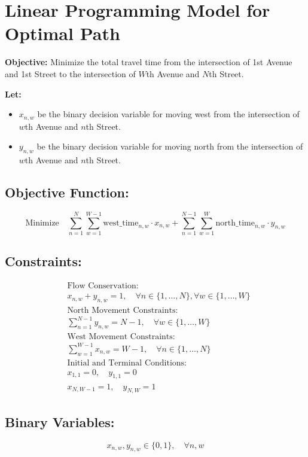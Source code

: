 \documentclass{article}
\begin{document}
\section*{Linear Programming Model for Optimal Path}

\textbf{Objective:} Minimize the total travel time from the intersection of 1st Avenue and 1st Street to the intersection of \(W\)th Avenue and \(N\)th Street.

\textbf{Let:}
\begin{itemize}
    \item \(x_{n,w}\) be the binary decision variable for moving west from the intersection of \(w\)th Avenue and \(n\)th Street.
    \item \(y_{n,w}\) be the binary decision variable for moving north from the intersection of \(w\)th Avenue and \(n\)th Street.
\end{itemize}

\subsection*{Objective Function:}

\[
\text{Minimize} \quad \sum_{n=1}^{N} \sum_{w=1}^{W-1} \text{west\_time}_{n,w} \cdot x_{n,w} + \sum_{n=1}^{N-1} \sum_{w=1}^{W} \text{north\_time}_{n,w} \cdot y_{n,w}
\]

\subsection*{Constraints:}

\begin{align*}
&\text{Flow Conservation:} \\
&x_{n,w} + y_{n,w} = 1, \quad \forall n \in \{1, \ldots, N\}, \forall w \in \{1, \ldots, W\}\\
&\text{North Movement Constraints:} \\
&\sum_{n=1}^{N-1} y_{n,w} = N-1, \quad \forall w \in \{1, \ldots, W\}\\
&\text{West Movement Constraints:} \\
&\sum_{w=1}^{W-1} x_{n,w} = W-1, \quad \forall n \in \{1, \ldots, N\}\\
&\text{Initial and Terminal Conditions:} \\
&x_{1,1} = 0, \quad y_{1,1} = 0\\
&x_{N,W-1} = 1, \quad y_{N,W} = 1
\end{align*}

\subsection*{Binary Variables:}

\[
x_{n,w}, y_{n,w} \in \{0, 1\}, \quad \forall n, w
\]
\end{document}
